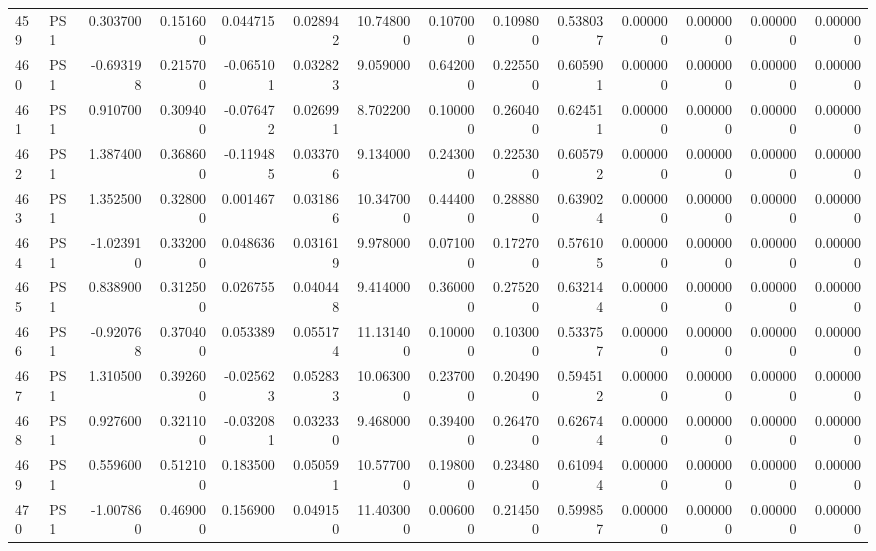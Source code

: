 \begin{tabular}{llrrrrrrrrrrrr}
459 &    PS1 &  0.303700 &      0.151600 &  0.044715 &    0.028942 &  10.748000 &      0.107000 &   0.109800 &  0.538037 &  0.000000 &   0.000000 &     0.000000 &     0.000000 \\
460 &    PS1 & -0.693198 &      0.215700 & -0.065101 &    0.032823 &   9.059000 &      0.642000 &   0.225500 &  0.605901 &  0.000000 &   0.000000 &     0.000000 &     0.000000 \\
461 &    PS1 &  0.910700 &      0.309400 & -0.076472 &    0.026991 &   8.702200 &      0.100000 &   0.260400 &  0.624511 &  0.000000 &   0.000000 &     0.000000 &     0.000000 \\
462 &    PS1 &  1.387400 &      0.368600 & -0.119485 &    0.033706 &   9.134000 &      0.243000 &   0.225300 &  0.605792 &  0.000000 &   0.000000 &     0.000000 &     0.000000 \\
463 &    PS1 &  1.352500 &      0.328000 &  0.001467 &    0.031866 &  10.347000 &      0.444000 &   0.288800 &  0.639024 &  0.000000 &   0.000000 &     0.000000 &     0.000000 \\
464 &    PS1 & -1.023910 &      0.332000 &  0.048636 &    0.031619 &   9.978000 &      0.071000 &   0.172700 &  0.576105 &  0.000000 &   0.000000 &     0.000000 &     0.000000 \\
465 &    PS1 &  0.838900 &      0.312500 &  0.026755 &    0.040448 &   9.414000 &      0.360000 &   0.275200 &  0.632144 &  0.000000 &   0.000000 &     0.000000 &     0.000000 \\
466 &    PS1 & -0.920768 &      0.370400 &  0.053389 &    0.055174 &  11.131400 &      0.100000 &   0.103000 &  0.533757 &  0.000000 &   0.000000 &     0.000000 &     0.000000 \\
467 &    PS1 &  1.310500 &      0.392600 & -0.025623 &    0.052833 &  10.063000 &      0.237000 &   0.204900 &  0.594512 &  0.000000 &   0.000000 &     0.000000 &     0.000000 \\
468 &    PS1 &  0.927600 &      0.321100 & -0.032081 &    0.032330 &   9.468000 &      0.394000 &   0.264700 &  0.626744 &  0.000000 &   0.000000 &     0.000000 &     0.000000 \\
469 &    PS1 &  0.559600 &      0.512100 &  0.183500 &    0.050591 &  10.577000 &      0.198000 &   0.234800 &  0.610944 &  0.000000 &   0.000000 &     0.000000 &     0.000000 \\
470 &    PS1 & -1.007860 &      0.469000 &  0.156900 &    0.049150 &  11.403000 &      0.006000 &   0.214500 &  0.599857 &  0.000000 &   0.000000 &     0.000000 &     0.000000 \\

\end{tabular}
